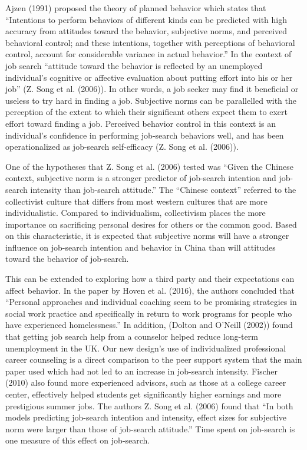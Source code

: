 \documentclass[]{elsarticle} %
\begin{document}
Ajzen (1991) proposed the theory of planned behavior which states that
``Intentions to perform behaviors of different kinds can be predicted
with high accuracy from attitudes toward the behavior, subjective norms,
and perceived behavioral control; and these intentions, together with
perceptions of behavioral control, account for considerable variance in
actual behavior.'' In the context of job search ``attitude toward the
behavior is reflected by an unemployed individual's cognitive or
affective evaluation about putting effort into his or her job'' (Z. Song
et al. (2006)). In other words, a job seeker may find it beneficial or
useless to try hard in finding a job. Subjective norms can be
parallelled with the perception of the extent to which their significant
others expect them to exert effort toward finding a job. Perceived
behavior control in this context is an individual's confidence in
performing job-search behaviors well, and has been operationalized as
job-search self-efficacy (Z. Song et al. (2006)).

One of the hypotheses that Z. Song et al. (2006) tested was ``Given the
Chinese context, subjective norm is a stronger predictor of job-search
intention and job-search intensity than job-search attitude.'' The
``Chinese context'' referred to the collectivist culture that differs
from most western cultures that are more individualistic. Compared to
individualism, collectivism places the more importance on sacrificing
personal desires for others or the common good. Based on this
characteristic, it is expected that subjective norms will have a
stronger influence on job-search intention and behavior in China than
will attitudes toward the behavior of job-search.

This can be extended to exploring how a third party and their
expectations can affect behavior. In the paper by Hoven et al. (2016),
the authors concluded that ``Personal approaches and individual coaching
seem to be promising strategies in social work practice and specifically
in return to work programs for people who have experienced
homelessness.'' In addition, (Dolton and O'Neill (2002)) found that
getting job search help from a counselor helped reduce long-term
unemployment in the UK. Our new design's use of individualized
professional career counseling is a direct comparison to the peer
support system that the main paper used which had not led to an increase
in job-search intensity. Fischer (2010) also found more experienced
advisors, such as those at a college career center, effectively helped
students get significantly higher earnings and more prestigious summer
jobs. The authors Z. Song et al. (2006) found that ``In both models
predicting job-search intention and intensity, effect sizes for
subjective norm were larger than those of job-search attitude.'' Time
spent on job-search is one measure of this effect on job-search.
\end{document}
